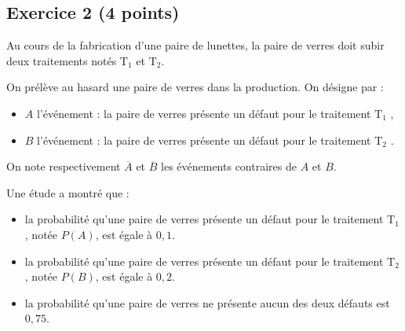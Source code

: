 \documentclass[11pt,a4paper]{article}
\begin{document}
\vspace{0.3cm}

\subsection*{Exercice 2 \hfill (4 points)}

Au cours de la fabrication d'une paire de lunettes, la paire de verres doit subir deux traitements notés $\mathrm{T}_1$ et $\mathrm{T}_2$.

On prélève au hasard une paire de verres dans la production. On désigne par :
\begin{itemize}[label=$\bullet$]
    \item $A$ l'événement : \og la paire de verres présente un défaut pour le traitement $\mathrm{T}_1$ \fg{},
    \item $B$ l'événement : \og la paire de verres présente un défaut pour le traitement $\mathrm{T}_2$ \fg{}.
\end{itemize}
On note respectivement $\overline{A}$ et $\overline{B}$ les événements contraires de $A$ et $B$.

Une étude a montré que :
\begin{itemize}[label=$\bullet$]
    \item la probabilité qu'une paire de verres présente un défaut pour le traitement $\mathrm{T}_1$, notée $P(A)$, est égale à $0{,}1$.
    \item la probabilité qu'une paire de verres présente un défaut pour le traitement $\mathrm{T}_2$, notée $P(B)$, est égale à $0{,}2$.
    \item la probabilité qu'une paire de verres ne présente aucun des deux défauts est $0{,}75$.
\end{itemize}
\end{document}
